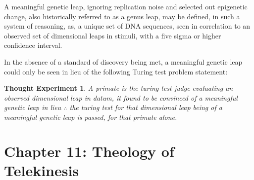 \documentclass[ebook,12pt,oneside,openany]{memoir}
\newtheorem*{thoughtexperiment}{Thought Experiment} %
\begin{document}
\indent A meaningful genetic leap, ignoring replication noise and selected out epigenetic change, also historically referred to as a genus leap, may be defined, in such a system of reasoning, as, a unique set of DNA sequences, seen in correlation to an observed set of dimensional leaps in stimuli, with a five sigma or higher confidence interval.

\indent In the absence of a standard of discovery being met, a meaningful genetic leap could only be seen in lieu of the following Turing test problem statement:

\indent \begin{thoughtexperiment}
A primate is the turing test judge evaluating an observed dimensional leap in datum, it found to be convinced of a meaningful genetic leap in lieu $\therefore$ the turing test for that dimensional leap being of a meaningful genetic leap is passed, for that primate alone.
\end{thoughtexperiment}
\chapter*{Chapter 11: Theology of Telekinesis}


\vspace*{\fill} %


\vspace*{\fill} %
\end{document}
